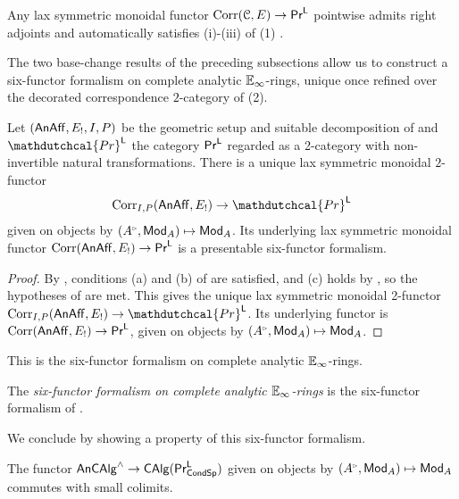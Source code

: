 \begin{remark}\label{rmk: presentable is automatically 6ff}
    Any lax symmetric monoidal functor $\mathrm{Corr}(\EuScript{C},E)\to\mathsf{Pr}^{\mathsf{L}}$ pointwise admits right adjoints and automatically satisfies (i)-(iii) of  (1) \cite[Lem. 3.2.5]{HeyerMann6FF}. 
\end{remark}
The two base-change results of the preceding subsections allow us to construct a six-functor formalism on complete analytic $\mathbb{E}_{\infty}$-rings, unique once refined over the decorated correspondence $2$-category of  (2). 
\begin{proposition}\label{prop: six-functor formalism on analytic E-infinity rings}
    Let $(\mathsf{An}\mathsf{Aff},E_{!}, I, P)$ be the geometric setup and suitable decomposition of  and $\mathdutchcal{Pr}^{\Lsf}$ the category $\mathsf{Pr}^{\mathsf{L}}$ regarded as a 2-category with non-invertible natural transformations. There is a unique lax symmetric monoidal $2$-functor
    $$\Corr_{I,P}(\An\Aff,E_{!})\to\mathdutchcal{Pr}^{\Lsf}$$
    given on objects by $(A^{\tri},\Mod_{A})\mapsto\Mod_{A}$. Its underlying lax symmetric monoidal functor $\mathrm{Corr}(\mathsf{An}\mathsf{Aff},E_{!})\to\mathsf{Pr}^{\mathsf{L}}$ is a presentable six-functor formalism.
\end{proposition}
\begin{proof}
    By , conditions (a) and (b) of \cite[Prop. 3.3.3]{HeyerMann6FF} are satisfied, and (c) holds by \cite[Cor. 3.3.5]{HeyerMann6FF}, so the hypotheses of \cite[Thm. 5.17]{ConstructionCLL} are met. This gives the unique lax symmetric monoidal 2-functor $\Corr_{I,P}(\An\Aff,E_{!})\to\mathdutchcal{Pr}^{\Lsf}$. Its underlying functor is $\mathrm{Corr}(\mathsf{An}\mathsf{Aff},E_{!})\to\mathsf{Pr}^{\mathsf{L}}$, given on objects by $(A^{\tri},\Mod_{A})\mapsto\Mod_{A}$.
\end{proof}
This is the six-functor formalism on complete analytic $\mathbb{E}_{\infty}$-rings. 
\begin{definition}\label{def: six-functor formalism on analytic E-infinity rings}
    The \emph{six-functor formalism on complete analytic $\mathbb{E}_{\infty}$-rings} is the six-functor formalism of . 
\end{definition}
We conclude by showing a property of this six-functor formalism. 
\begin{proposition}\label{prop: categorical kunneth for analytic rings}
    The functor $\mathsf{An}\mathsf{CAlg}^{\wedge}\to\mathsf{CAlg}(\mathsf{Pr}^{\mathsf{L}}_{\mathsf{Cond}\mathsf{Sp}})$ given on objects by $(A^{\tri},\Mod_{A})\mapsto\Mod_{A}$ commutes with small colimits. 
\end{proposition}
